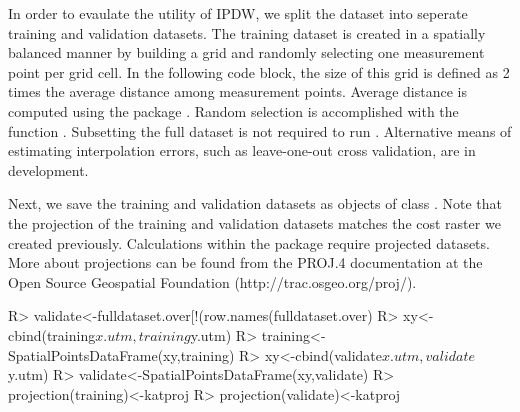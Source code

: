\documentclass[nojss,shortnames]{jss}
\begin{document}
In order to evaulate the utility of IPDW, we split the dataset into seperate training and validation datasets. The training dataset is created in a spatially balanced manner by building a grid and randomly selecting one measurement point per grid cell. In the following code block, the size of this grid is defined as 2 times the average distance among measurement points. Average distance is computed using the  package \citep{bad2005}. Random selection is accomplished with the  function  \citep{warn2014}. Subsetting the full dataset is not required to run . Alternative means of estimating interpolation errors, such as leave-one-out cross validation, are in development.
\newpage

\begin{Schunk}
\end{Schunk}

Next, we save the training and validation datasets as objects of class . Note that the projection of the training and validation datasets matches the cost raster we created previously. Calculations within the  package require projected datasets. More about  projections can be found from the PROJ.4 documentation at the Open Source Geospatial Foundation (http://trac.osgeo.org/proj/).

\newpage
\begin{Schunk}
\begin{Sinput}
R> validate<-fulldataset.over[!(row.names(fulldataset.over) %
R> xy<-cbind(training$x.utm,training$y.utm)
R> training<-SpatialPointsDataFrame(xy,training)
R> xy<-cbind(validate$x.utm,validate$y.utm)
R> validate<-SpatialPointsDataFrame(xy,validate)
R> projection(training)<-katproj
R> projection(validate)<-katproj
\end{Sinput}
\end{Schunk}
\end{document}

